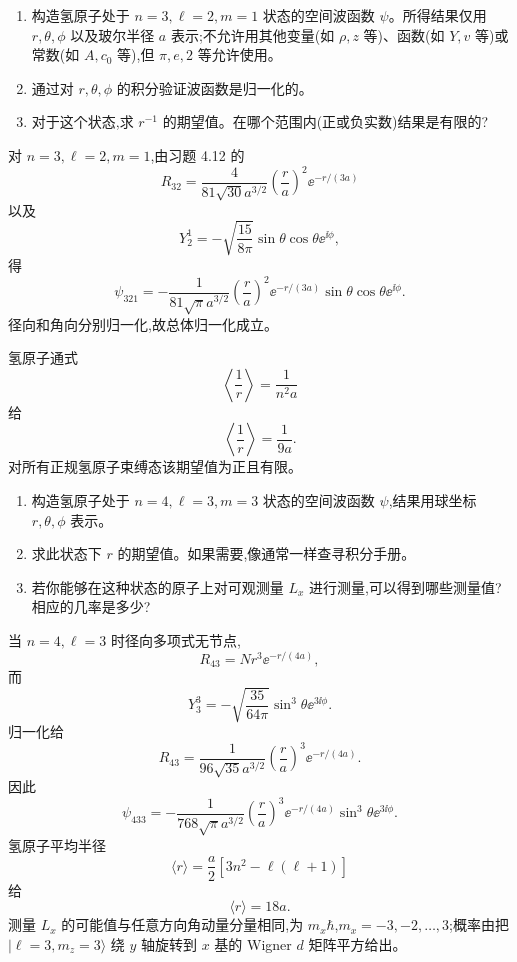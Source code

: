 \begin{question}
\begin{enumerate}
\item 构造氢原子处于 $n=3,\ell=2,m=1$ 状态的空间波函数 $\psi$。所得结果仅用 $r,\theta,\phi$ 以及玻尔半径 $a$ 表示;不允许用其他变量(如 $\rho,z$ 等)、函数(如 $Y,v$ 等)或常数(如 $A,c_0$ 等),但 $\pi,e,2$ 等允许使用。
\item 通过对 $r,\theta,\phi$ 的积分验证波函数是归一化的。
\item 对于这个状态,求 $r^{-1}$ 的期望值。在哪个范围内(正或负实数)结果是有限的?
\end{enumerate}
\begin{solution}

对 $n=3,\ell=2,m=1$,由习题 4.12 的
\[
R_{32}=\frac{4}{81\sqrt{30}a^{3/2}}\left(\frac{r}{a}\right)^2\ee^{-r/(3a)}
\]
以及
\[
Y_2^1=-\sqrt{\frac{15}{8\pi}}\sin\theta\cos\theta \ee^{\ii\phi},
\]
得
\[
\psi_{321}=-\frac{1}{81\sqrt{\pi}a^{3/2}}\left(\frac{r}{a}\right)^2\ee^{-r/(3a)}\sin\theta\cos\theta \ee^{\ii\phi}.
\]
径向和角向分别归一化,故总体归一化成立。

氢原子通式
\[
\left\langle\frac1r\right\rangle=\frac{1}{n^2a}
\]
给
\[
\left\langle\frac1r\right\rangle=\frac{1}{9a}.
\]
对所有正规氢原子束缚态该期望值为正且有限。

\end{solution}
\end{question}

\begin{question}
\begin{enumerate}
\item 构造氢原子处于 $n=4,\ell=3,m=3$ 状态的空间波函数 $\psi$,结果用球坐标 $r,\theta,\phi$ 表示。
\item 求此状态下 $r$ 的期望值。如果需要,像通常一样查寻积分手册。
\item 若你能够在这种状态的原子上对可观测量 $L_x$ 进行测量,可以得到哪些测量值?相应的几率是多少?
\end{enumerate}
\begin{solution}

当 $n=4,\ell=3$ 时径向多项式无节点,
\[
R_{43}=N r^3\ee^{-r/(4a)},
\]
而
\[
Y_3^3=-\sqrt{\frac{35}{64\pi}}\sin^3\theta \ee^{3\ii\phi}.
\]
归一化给
\[
R_{43}=\frac{1}{96\sqrt{35}a^{3/2}}\left(\frac{r}{a}\right)^3\ee^{-r/(4a)}.
\]
因此
\[
\psi_{433}=-\frac{1}{768\sqrt\pi a^{3/2}}\left(\frac{r}{a}\right)^3\ee^{-r/(4a)}\sin^3\theta \ee^{3\ii\phi}.
\]
氢原子平均半径
\[
\langle r\rangle=\frac{a}{2}[3n^2-\ell(\ell+1)]
\]
给
\[
\langle r\rangle=18a.
\]
测量 $L_x$ 的可能值与任意方向角动量分量相同,为 $m_x\hbar$,$m_x=-3,-2,\ldots,3$;概率由把 $|\ell=3,m_z=3\rangle$ 绕 $y$ 轴旋转到 $x$ 基的 Wigner $d$ 矩阵平方给出。

\end{solution}
\end{question}

